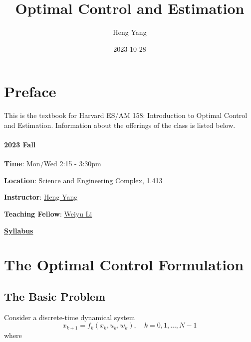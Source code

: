\documentclass[
]{book}
\title{Optimal Control and Estimation}
\author{Heng Yang}
\date{2023-10-28}
\theoremstyle{definition}
\theoremstyle{definition}
\theoremstyle{definition}
\theoremstyle{definition}
\theoremstyle{remark}
\begin{document}
\maketitle

{
\setcounter{tocdepth}{1}
\tableofcontents
}
\hypertarget{preface}{%
\chapter*{Preface}\label{preface}}

This is the textbook for Harvard ES/AM 158: Introduction to Optimal Control and Estimation. Information about the offerings of the class is listed below.

\hypertarget{fall}{%
\subsubsection*{2023 Fall}\label{fall}}

\textbf{Time}: Mon/Wed 2:15 - 3:30pm

\textbf{Location}: Science and Engineering Complex, 1.413

\textbf{Instructor}: \href{https://hankyang.seas.harvard.edu/}{Heng Yang}

\textbf{Teaching Fellow}: \href{https://scholar.harvard.edu/weiyuli/home}{Weiyu Li}

\href{https://docs.google.com/document/d/1q8_jB5dLx9jHOBi3DQ48Vv2E243ocGCGm_H0mJuOojM/edit?usp=sharing}{\textbf{Syllabus}}

\hypertarget{formulation}{%
\chapter{The Optimal Control Formulation}\label{formulation}}

\hypertarget{the-basic-problem}{%
\section{The Basic Problem}\label{the-basic-problem}}

Consider a discrete-time dynamical system
\begin{equation}
x_{k+1} = f_k (x_k, u_k, w_k), \quad k =0,1,\dots,N-1
\label{eq:discrete-time-dynamics}
\end{equation}
where
\end{document}
